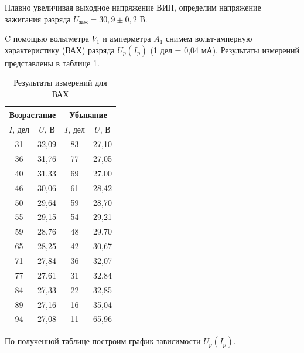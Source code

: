 \documentclass[a4paper]{article}
\theoremstyle{definition}
\theoremstyle{remark}
\begin{document}
Плавно увеличивая выходное напряжение ВИП, определим напряжение зажигания разряда $U_{\text{заж}} = 30,9 \pm 0,2$ В. \medskip

C помощью вольтметра $V_1$ и амперметра $A_1$ снимем вольт-амперную характеристику (ВАХ) разряда $U_p(I_p)$ (1 дел = 0,04 мА). Результаты измерений представлены в таблице 1.

\begin{table}[h!]
    \centering
    \caption{Результаты измерений для ВАХ}
    \begin{tabular}{|c|c|c|c|}
    \hline
    \multicolumn{2}{|c|}{Возрастание} & \multicolumn{2}{c|}{Убывание} \\ \hline
    $I$, дел         & $U$, В         & $I$, дел       & $U$, В       \\ \hline
    31               & 32,09          & 83             & 27,10        \\ \hline
    36               & 31,76          & 77             & 27,05        \\ \hline
    40               & 31,33          & 69             & 27,00        \\ \hline
    46               & 30,06          & 61             & 28,42        \\ \hline
    50               & 29,64          & 59             & 28,70        \\ \hline
    55               & 29,15          & 54             & 29,21        \\ \hline
    59               & 28,76          & 48             & 29,70        \\ \hline
    65               & 28,25          & 42             & 30,67        \\ \hline
    71               & 27,84          & 36             & 32,07        \\ \hline
    77               & 27,61          & 31             & 32,84        \\ \hline
    84               & 27,33          & 22             & 32,85        \\ \hline
    89               & 27,16          & 16             & 35,04        \\ \hline
    94               & 27,08          & 11             & 65,96        \\ \hline
    \end{tabular}
    \end{table}

    По полученной таблице построим график зависимости $U_p(I_p)$.
\end{document}
